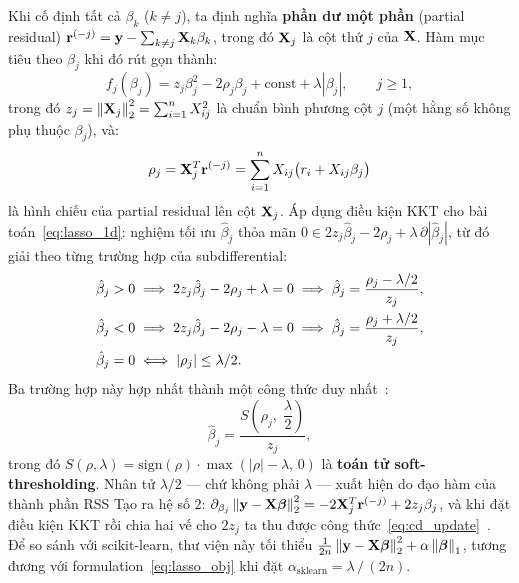 Khi cố định tất cả $\beta_k$ ($k \neq j$), ta định nghĩa
\textbf{phần dư một phần} (partial residual) $\mathbf{r}^{(-j)} = \mathbf{y} - \sum_{k \neq j}\mathbf{X}_k\beta_k$,
trong đó $\mathbf{X}_j$ là cột thứ $j$ của $\mathbf{X}$. Hàm mục tiêu theo $\beta_j$ khi đó
rút gọn thành:
\begin{equation}
    f_j(\beta_j)
    = z_j\beta_j^2 - 2\rho_j\beta_j + \text{const} + \lambda|\beta_j|,
    \qquad j \geq 1,
    \label{eq:lasso_1d}
\end{equation}
trong đó $z_j = \left\lVert\mathbf{X}_j\right\rVert_2^2 = \sum_{i=1}^n X_{ij}^2$ là chuẩn bình phương cột
$j$ (một hằng số không phụ thuộc $\beta_j$), và:
\begin{equation}
    \rho_j = \mathbf{X}_j^T\mathbf{r}^{(-j)}
    = \sum_{i=1}^n X_{ij}\bigl(r_i + X_{ij}\beta_j\bigr)
    \label{eq:rho_j}
\end{equation}
là hình chiếu của partial residual lên cột $\mathbf{X}_j$. Áp dụng điều kiện KKT cho
bài toán~\eqref{eq:lasso_1d}: nghiệm tối ưu $\hat{\beta}_j$ thỏa mãn
$0 \in 2z_j\hat{\beta}_j - 2\rho_j + \lambda\,\partial|\hat{\beta}_j|$, từ đó giải
theo từng trường hợp của subdifferential:
\begin{align}
    \hat{\beta}_j > 0 &\implies 2z_j\hat{\beta}_j - 2\rho_j + \lambda = 0
        \implies \hat{\beta}_j = \frac{\rho_j - \lambda/2}{z_j}, \notag\\
    \hat{\beta}_j < 0 &\implies 2z_j\hat{\beta}_j - 2\rho_j - \lambda = 0
        \implies \hat{\beta}_j = \frac{\rho_j + \lambda/2}{z_j}, \notag\\
    \hat{\beta}_j = 0 &\iff |\rho_j| \leq \lambda/2. \notag
\end{align}
Ba trường hợp này hợp nhất thành một công thức duy nhất~\cite{tibshirani1996,friedman2010}:
\begin{equation}
    \hat{\beta}_j = \frac{S\!\left(\rho_j,\;\dfrac{\lambda}{2}\right)}{z_j},
    \label{eq:cd_update}
\end{equation}
trong đó $S(\rho, \lambda) = \mathrm{sign}(\rho)\cdot\max(|\rho| - \lambda,\,0)$ là
\textbf{toán tử soft-thresholding}. Nhân tử $\lambda/2$ --- chứ không phải $\lambda$ ---
xuất hiện do đạo hàm của thành phần RSS Tạo ra hệ số $2$:
$\partial_{\beta_j}\left\lVert\mathbf{y} - \mathbf{X}\boldsymbol{\beta}\right\rVert_2^2 = -2\mathbf{X}_j^T\mathbf{r}^{(-j)} + 2z_j\beta_j$,
và khi đặt điều kiện KKT rồi chia hai vế cho $2z_j$ ta thu được
công thức~\eqref{eq:cd_update}~\cite{friedman2010}. Để so sánh với scikit-learn, thư
viện này tối thiểu $\frac{1}{2n}\left\lVert\mathbf{y}-\mathbf{X}\boldsymbol{\beta}\right\rVert_2^2 + \alpha\left\lVert\boldsymbol{\beta}\right\rVert_1$,
tương đương với formulation~\eqref{eq:lasso_obj} khi đặt
$\alpha_{\text{sklearn}} = \lambda\,/\,(2n)$.

